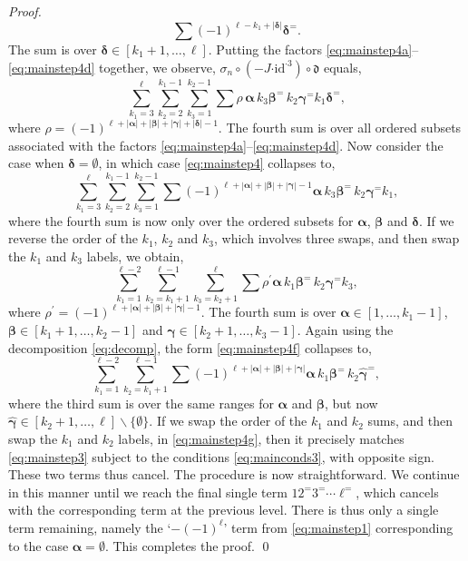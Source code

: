 \documentclass[10pt,a4paper]{amsart}
\newcommand*{\balpha}{\boldsymbol{\alpha}}
\newcommand*{\bbeta}{\boldsymbol{\beta}}
\newcommand*{\bdelta}{\boldsymbol{\delta}}
\newcommand*{\bgamma}{\boldsymbol{\gamma}}
\newcommand*{\cendot}{\boldsymbol{\cdot}}
\newcommand*{\df}{\mathfrak d}
\newcommand*{\id}{{\mathrm{id}}}
\begin{document}
\begin{proof}
\begin{equation}
    \sum(-1)^{\ell-k_1+|\bdelta|}\bdelta^=.
\end{equation}
The sum is over $\bdelta\in[k_1+1,\ldots,\ell]$.
Putting the factors \eqref{eq:mainstep4a}--\eqref{eq:mainstep4d} together, we observe, $\sigma_n\circ(-J\cendot\id^{\cendot3})\circ\df$ equals,
\begin{equation}\label{eq:mainstep4}
   \sum_{k_1=3}^\ell\sum_{k_2=2}^{k_1-1}\sum_{k_3=1}^{k_2-1} \sum\rho\,\balpha\,k_3\bbeta^=\,k_2\bgamma^=k_1\bdelta^=,
\end{equation}
where $\rho=(-1)^{\ell+|\balpha|+|\bbeta|+|\bgamma|+|\bdelta|-1}$.
The fourth sum is over all ordered subsets associated with the factors \eqref{eq:mainstep4a}--\eqref{eq:mainstep4d}.
Now consider the case when $\bdelta=\emptyset$, in which case \eqref{eq:mainstep4} collapses to, 
\begin{equation}\label{eq:mainstep4e}
   \sum_{k_1=3}^\ell\sum_{k_2=2}^{k_1-1}\sum_{k_3=1}^{k_2-1} \sum(-1)^{\ell+|\balpha|+|\bbeta|+|\bgamma|-1}\balpha\,k_3\bbeta^=\,k_2\bgamma^=k_1,
\end{equation}
where the fourth sum is now only over the ordered subsets for $\balpha$, $\bbeta$ and $\bdelta$.
If we reverse the order of the $k_1$, $k_2$ and $k_3$, which involves three swaps, and then swap the $k_1$ and $k_3$ labels, we obtain,
\begin{equation}\label{eq:mainstep4f}
   \sum_{k_1=1}^{\ell-2}\sum_{k_2=k_1+1}^{\ell-1}\sum_{k_3=k_2+1}^{\ell} \sum\rho^\prime\balpha\,k_1\bbeta^=\,k_2\bgamma^=k_3,
\end{equation}
where $\rho^\prime=(-1)^{\ell+|\balpha|+|\bbeta|+|\bgamma|-1}$.
The fourth sum is over $\balpha\in[1,\ldots,k_1-1]$, $\bbeta\in[k_1+1,\ldots,k_2-1]$ and $\bgamma\in[k_2+1,\ldots,k_3-1]$.
Again using the decomposition \eqref{eq:decomp}, the form \eqref{eq:mainstep4f} collapses to,
\begin{equation}\label{eq:mainstep4g}
   \sum_{k_1=1}^{\ell-2}\sum_{k_2=k_1+1}^{\ell-1}\sum(-1)^{\ell+|\balpha|+|\bbeta|+|\bgamma|}\balpha\,k_1\bbeta^=\,k_2\hat{\bgamma}^=,
\end{equation}
where the third sum is over the same ranges for $\balpha$ and $\bbeta$, but now $\hat{\bgamma}\in[k_2+1,\ldots,\ell]\backslash\{\emptyset\}$.
If we swap the order of the $k_1$ and $k_2$ sums, and then swap the $k_1$ and $k_2$ labels, in \eqref{eq:mainstep4g},
then it precisely matches \eqref{eq:mainstep3} subject to the conditions \eqref{eq:mainconds3}, with opposite sign.
These two terms thus cancel.
The procedure is now straightforward. We continue in this manner until we reach the final single term $12^=3^=\cdots\ell^=$, which cancels with the corresponding term at the previous level.
There is thus only a single term remaining, namely the `$-(-1)^{\ell}$' term from \eqref{eq:mainstep1} corresponding to the case $\balpha=\emptyset$.
This completes the proof.
\qed
\end{proof}
\end{document}

